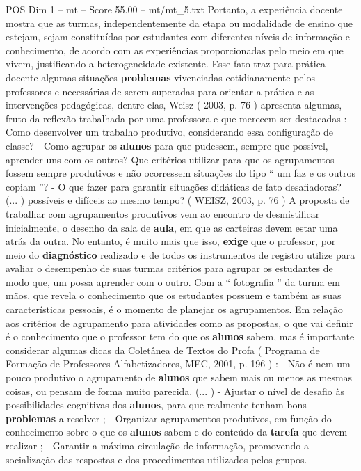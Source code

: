 \begin{textsample}{POS Dim 1 – mt – Score 55.00 – mt/mt\_5.txt}
Portanto, a experiência docente mostra que as turmas, independentemente da etapa ou modalidade de ensino que estejam, sejam constituídas por estudantes com diferentes níveis de informação e conhecimento, de acordo com as experiências proporcionadas pelo meio em que vivem, justificando a heterogeneidade existente.
Esse fato traz para prática docente algumas situações \textbf{problemas} vivenciadas cotidianamente pelos professores e necessárias de serem superadas para orientar a prática e as intervenções pedagógicas, dentre elas, Weisz ( 2003, p. 76 ) apresenta algumas, fruto da reflexão trabalhada por uma professora e que merecem ser destacadas : - Como desenvolver um trabalho produtivo, considerando essa configuração de classe? - Como agrupar os \textbf{alunos} para que pudessem, sempre que possível, aprender uns com os outros?
Que critérios utilizar para que os agrupamentos fossem sempre produtivos e não ocorressem situações do tipo “ um faz e os outros copiam ”? - O que fazer para garantir situações didáticas de fato desafiadoras? (... ) possíveis e difíceis ao mesmo tempo? ( WEISZ, 2003, p. 76 ) A proposta de trabalhar com agrupamentos produtivos vem ao encontro de desmistificar inicialmente, o desenho da sala de \textbf{aula}, em que as carteiras devem estar uma atrás da outra.
No entanto, é muito mais que isso, \textbf{exige} que o professor, por meio do \textbf{diagnóstico} realizado e de todos os instrumentos de registro utilize para avaliar o desempenho de suas turmas critérios para agrupar os estudantes de modo que, um possa aprender com o outro.
Com a “ fotografia ” da turma em mãos, que revela o conhecimento que os estudantes possuem e também as suas características pessoais, é o momento de planejar os agrupamentos.
Em relação aos critérios de agrupamento para atividades como as propostas, o que vai definir é o conhecimento que o professor tem do que os \textbf{alunos} sabem, mas é importante considerar algumas dicas da Coletânea de Textos do Profa ( Programa de Formação de Professores Alfabetizadores, MEC, 2001, p. 196 ) : - Não é nem um pouco produtivo o agrupamento de \textbf{alunos} que sabem mais ou menos as mesmas coisas, ou pensam de forma muito parecida. (... ) - Ajustar o nível de desafio às possibilidades cognitivas dos \textbf{alunos}, para que realmente tenham bons \textbf{problemas} a resolver ; - Organizar agrupamentos produtivos, em função do conhecimento sobre o que os \textbf{alunos} sabem e do conteúdo da \textbf{tarefa} que devem realizar ; - Garantir a máxima circulação de informação, promovendo a socialização das respostas e dos procedimentos utilizados pelos grupos.

\end{textsample}
